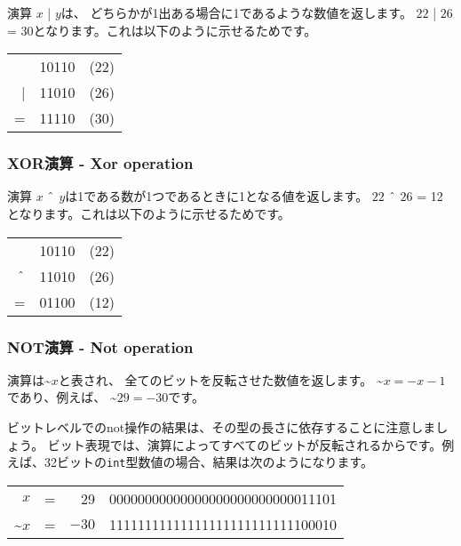 
演算 $x$ | $y$は、
どちらかが1出ある場合に1であるような数値を返します。
$22$ | $26$ = 30となります。これは以下のように示せるためです。

\begin{center}
\begin{tabular}{rrr}
& 10110 & (22)\\
| & 11010 & (26) \\
\hline
 = & 11110 & (30) \\
\end{tabular}
\end{center}

\subsubsection{XOR演算 - Xor operation}


演算 $x$ $\XOR$ $y$は1である数が1つであるときに1となる値を返します。
$22$ $\XOR$ $26$ = 12となります。これは以下のように示せるためです。

\begin{center}
\begin{tabular}{rrr}
& 10110 & (22)\\
$\XOR$ & 11010 & (26) \\
\hline
 = & 01100 & (12) \\
\end{tabular}
\end{center}

\subsubsection{NOT演算 - Not operation}


 演算は\textasciitilde$x$と表され、
全てのビットを反転させた数値を返します。
\textasciitilde$x = -x-1$であり、例えば、
\textasciitilde$29 = -30$です。

ビットレベルでのnot操作の結果は、その型の長さに依存することに注意しましょう。
ビット表現では、演算によってすべてのビットが反転されるからです。例えば、32ビットの\texttt{int}型数値の場合、結果は次のようになります。
\begin{center}
\begin{tabular}{rrrr}
$x$ & = & 29 &   00000000000000000000000000011101 \\
\textasciitilde$x$ & = & $-30$ & 11111111111111111111111111100010 \\
\end{tabular}
\end{center}

